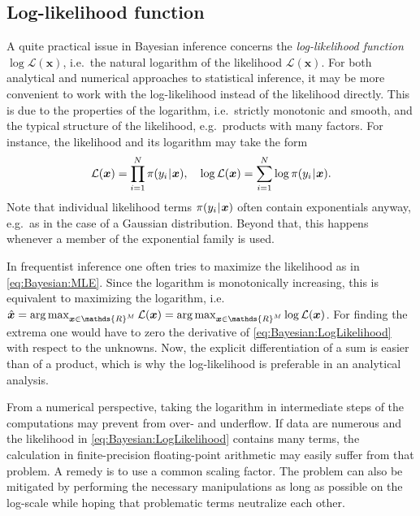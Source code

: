 \subsection{Log-likelihood function} \label{sec:Bayesian:BayesianComputations:LogLikelihood}
A quite practical issue in Bayesian inference concerns the \emph{log-likelihood function} \(\log \mathcal{L}(\bm{x})\), i.e.\ the natural logarithm of the likelihood \(\mathcal{L}(\bm{x})\).
For both analytical and numerical approaches to statistical inference, it may be more convenient to work with the log-likelihood instead of the likelihood directly.
This is due to the properties of the logarithm, i.e.\ strictly monotonic and smooth, and the typical structure of the likelihood, e.g.\ products with many factors.
For instance, the likelihood and its logarithm may take the form
\begin{equation} \label{eq:Bayesian:LogLikelihood}
  \mathcal{L}(\bm{x}) = \prod\limits_{i=1}^{N} \pi(y_i {\:\!}|{\:\!} \bm{x}), \quad
  \log \mathcal{L}(\bm{x}) = \sum\limits_{i=1}^{N} \log \pi(y_i {\:\!}|{\:\!} \bm{x}).
\end{equation}
Note that individual likelihood terms \(\pi(y_i {\:\!}|{\:\!} \bm{x})\) often contain exponentials anyway, e.g.\ as in the case of a Gaussian distribution.
Beyond that, this happens whenever a member of the exponential family is used.
\par %
In frequentist inference one often tries to maximize the likelihood as in \cref{eq:Bayesian:MLE}.
Since the logarithm is monotonically increasing, this is equivalent to maximizing the logarithm,
i.e.\ \(\hat{\bm{x}} = \operatorname*{arg\,max}_{\bm{x} \in \mathds{R}^\dimParam} \mathcal{L}(\bm{x}) = \operatorname*{arg\,max}_{\bm{x} \in \mathds{R}^\dimParam} \log \mathcal{L}(\bm{x})\).
For finding the extrema one would have to zero the derivative of \cref{eq:Bayesian:LogLikelihood} with respect to the unknowns.
Now, the explicit differentiation of a sum is easier than of a product, which is why the log-likelihood is preferable in an analytical analysis.
\par %
From a numerical perspective, taking the logarithm in intermediate steps of the computations may prevent from over- and underflow.
If data are numerous and the likelihood in \cref{eq:Bayesian:LogLikelihood} contains many terms,
the calculation in finite-precision floating-point arithmetic may easily suffer from that problem.
A remedy is to use a common scaling factor.
The problem can also be mitigated by performing the necessary manipulations as long as possible on the log-scale while hoping that problematic terms neutralize each other.
